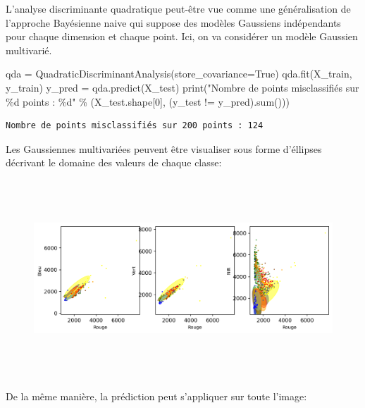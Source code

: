 \documentclass[
]{article}
\newenvironment{Shaded}{}{}
\newcommand{\BuiltInTok}[1]{\textcolor[rgb]{0.00,0.50,0.00}{#1}}
\newcommand{\DecValTok}[1]{\textcolor[rgb]{0.25,0.63,0.44}{#1}}
\newcommand{\NormalTok}[1]{#1}
\newcommand{\OperatorTok}[1]{\textcolor[rgb]{0.40,0.40,0.40}{#1}}
\newcommand{\SpecialCharTok}[1]{\textcolor[rgb]{0.25,0.44,0.63}{#1}}
\newcommand{\StringTok}[1]{\textcolor[rgb]{0.25,0.44,0.63}{#1}}
\newcommand{\VariableTok}[1]{\textcolor[rgb]{0.10,0.09,0.49}{#1}}
\begin{document}
L'analyse discriminante quadratique peut-être vue comme une
généralisation de l'approche Bayésienne naive qui suppose des modèles
Gaussiens indépendants pour chaque dimension et chaque point. Ici, on va
considérer un modèle Gaussien multivarié.

\label{e513ddf0}
\label{cb47}
\begin{Shaded}
\begin{Highlighting}[]
\NormalTok{qda }\OperatorTok{=}\NormalTok{ QuadraticDiscriminantAnalysis(store\_covariance}\OperatorTok{=}\VariableTok{True}\NormalTok{)}
\NormalTok{qda.fit(X\_train, y\_train)}
\NormalTok{y\_pred }\OperatorTok{=}\NormalTok{ qda.predict(X\_test)}
\BuiltInTok{print}\NormalTok{(}\StringTok{"Nombre de points misclassifiés sur }\SpecialCharTok{\%d}\StringTok{ points : }\SpecialCharTok{\%d}\StringTok{"}
  \OperatorTok{\%}\NormalTok{ (X\_test.shape[}\DecValTok{0}\NormalTok{], (y\_test }\OperatorTok{!=}\NormalTok{ y\_pred).}\BuiltInTok{sum}\NormalTok{()))}
\end{Highlighting}
\end{Shaded}

\begin{verbatim}
Nombre de points misclassifiés sur 200 points : 124
\end{verbatim}

Les Gaussiennes multivariées peuvent être visualiser sous forme
d'éllipses décrivant le domaine des valeurs de chaque classe:

\label{6dfabd0f}
\begin{figure}
\centering
\includegraphics[width=7.78125in,height=2.90625in]{05-ClassificationsSupervisees_files/figure-html/cell-46-output-1.png}
\caption{}
\end{figure}

De la même manière, la prédiction peut s'appliquer sur toute l'image:
\end{document}
